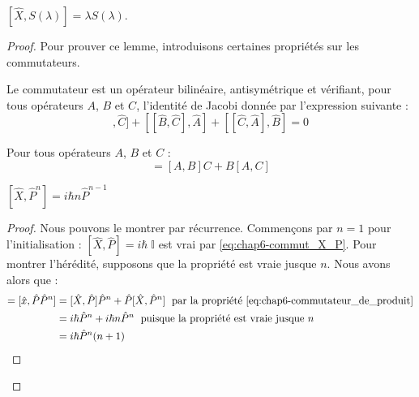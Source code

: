 \documentclass[../notesdecours]{subfiles}
\begin{document}
\begin{lemma}
    $[\hat X, S(\lambda)] = \lambda S(\lambda)$.
\end{lemma}
\begin{proof}
    Pour prouver ce lemme, introduisons certaines propriétés sur les commutateurs.

    \begin{proposition}\label{pr:chap6-commutateur_bilineaire_jacobi}
        Le commutateur est un opérateur bilinéaire, antisymétrique et vérifiant, pour tous opérateurs $A$, $B$ et $C$, l'identité de Jacobi donnée par l'expression suivante :
            \begin{equation}
                [[\hat{A},\hat{B}],\hat{C}] + [[\hat{B},\hat{C}],\hat{A}] + [[\hat{C},\hat{A}],\hat{B}] = 0
            \end{equation}
    \end{proposition}

    \begin{proposition}
        Pour tous opérateurs $A$, $B$ et $C$ : 
        \begin{equation}
            [A,BC] = [A,B]C + B[A,C]
            \label{eq:chap6-commutateur_de_produit}
        \end{equation}
    \end{proposition}

    \begin{proposition}
        $[\hat{X}, \hat{P}^n] = i\hbar n\hat{P}^{n-1}$

        \begin{proof}
            Nous pouvons le montrer par récurrence. Commençons par $n=1$ pour l'initialisation : $[\hat{X}, \hat{P}] = i\hbar \; \mathbb{I}$ est vrai par \eqref{eq:chap6-commut_X_P}. Pour montrer l'hérédité, supposons que la propriété est vraie jusque $n$. Nous avons alors que :
            \begin{align} [\hat{X}, \hat{P}^{n+1}] = [\hat{x}, \hat{P}\hat{P}^n] &= [\hat{X}, \hat{P}]\hat{P}^n + \hat{P}[\hat{X}, \hat{P}^n] \; \mbox{ par la propriété \eqref{eq:chap6-commutateur_de_produit}} \notag \\
                &= i\hbar \hat{P}^n + i\hbar n \hat{P}^n \; \mbox{ puisque la propriété est vraie jusque $n$} \notag \\
                &= i\hbar \hat{P}^n (n+1)
            \end{align}
        \end{proof}
    \end{proposition}


\end{proof}
\end{document}

